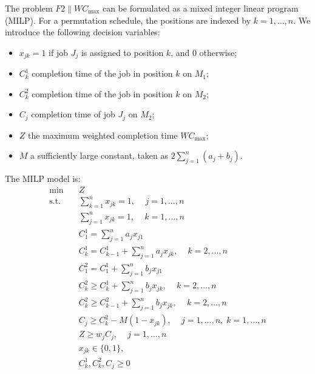 \documentclass[12pt]{article}
\begin{document}
\begin{sloppypar}
The problem $F2 \parallel W C_{\max}$ can be formulated as a mixed integer linear program (MILP).
For a permutation schedule, the positions are indexed by $k = 1,\dots,n$.
We introduce the following decision variables:
\begin{itemize}
	\item $x_{jk} = 1$ if job $J_j$ is assigned to position $k$, and $0$ otherwise;
	\item $C_k^1$ completion time of the job in position $k$ on $M_1$;
	\item $C_k^2$ completion time of the job in position $k$ on $M_2$;
	\item $C_j$ completion time of job $J_j$ on $M_2$;
	\item $Z$ the maximum weighted completion time $W C_{\max}$;
	\item $M$ a sufficiently large constant, taken as $2\sum_{j=1}^{n}(a_j + b_j)$.
\end{itemize}
The MILP model is:
\begin{align}
	\min \quad & Z \label{milp:obj} \\[4pt]
	\text{s.t.} \quad & \sum_{k=1}^{n} x_{jk} = 1, \quad \, j = 1,\dots,n \label{milp:assign1} \\[4pt]
	& \sum_{j=1}^{n} x_{jk} = 1, \quad \, k = 1,\dots,n \label{milp:assign2} \\[4pt]
	& C_1^1 = \sum_{j=1}^{n} a_j x_{j1} \label{milp:m1_start} \\[4pt]
	& C_k^1 = C_{k-1}^1 + \sum_{j=1}^{n} a_j x_{jk}, \quad \, k = 2,\dots,n \label{milp:m1_rec} \\[4pt]
	& C_1^2 = C_1^1 + \sum_{j=1}^{n} b_j x_{j1} \label{milp:m2_start} \\[4pt]
	& C_k^2 \ge C_k^1 + \sum_{j=1}^{n} b_j x_{jk}, \quad \, k = 2,\dots,n \label{milp:m2_a} \\[4pt]
	& C_k^2 \ge C_{k-1}^2 + \sum_{j=1}^{n} b_j x_{jk}, \quad \, k = 2,\dots,n \label{milp:m2_b} \\[4pt]
	& C_j \ge C_k^2 - M(1 - x_{jk}), \quad \, j = 1,\dots,n,\; k = 1,\dots,n \label{milp:link} \\[4pt]
	& Z \ge w_j C_j, \quad \, j = 1,\dots,n \label{milp:wcmax} \\[4pt]
	& x_{jk} \in \{0,1\},\quad \label{milp:x}\\[4pt]
	& C_k^1, C_k^2, C_j \ge 0 \quad \label{milp:dom}
\end{align}


\end{sloppypar}
\end{document}
